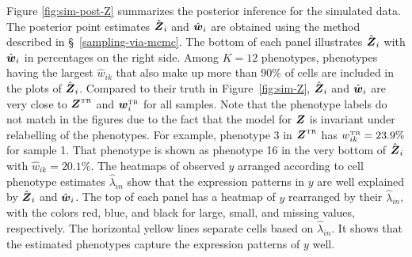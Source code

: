 \documentclass[12pt,]{article}
\def\Z{\bm{Z}}
\newcommand{\true}{{\mbox{\tiny TR}}}
\newcommand{\bZ}{\mbox{\boldmath $Z$}}
\newcommand{\bw}{\mbox{\boldmath $w$}}
\begin{document}
Figure \ref{fig:sim-post-Z} summarizes the posterior inference for the
simulated data.  The posterior point estimates $\hat{\bZ}_i$ and $\hat{\bw}_i$
are obtained using the method described in \S~\ref{sampling-via-mcmc}.  
%
The bottom of each panel illustrates $\hat{\bZ}_i$ with $\hat{\bw}_i$ in
percentages on the right side. Among $K=12$ phenotypes, phenotypes having the
largest $\hat{w}_{ik}$ that also make up more than 90\% of cells are included
in the plots of $\hat{\bZ}_i$. Compared to their truth in Figure~\ref{fig:sim-Z},
$\hat{\bZ}_i$ and $\hat{\bw}_i$ are very close to $\bZ^\true$ and $\bw_i^\true$
for all samples. Note that the phenotype labels do not match in the figures due
to the fact that the model for $\bZ$ is invariant under relabelling of the
phenotypes. For example, phenotype 3 in $\bZ^\true$ has $w^\true_{ik}=23.9\%$
for sample 1.  That phenotype is shown as phenotype 16 in the very bottom of
$\hat{\bZ}_i$ with $\hat{w}_{ik}=20.1\%$.
The heatmaps of observed $y$ arranged according to cell phenotype estimates $\hat{\lambda}_{in}$ show
that the expression patterns in $y$ are well explained by $\hat{\bZ}_i$ and
$\hat{\bw}_i$.  The top of each panel has a heatmap of $y$ rearranged by their
$\hat{\lambda}_{in}$, with the colors red, blue, and black for large, small, and
missing values, respectively.  The horizontal yellow lines separate cells based
on $\hat{\lambda}_{in}$.  It shows that the estimated phenotypes capture the
expression patterns of $y$ well.
\end{document}
